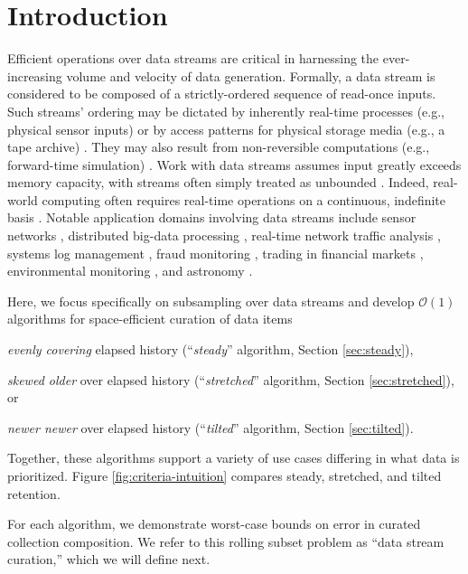 \section{Introduction} \label{sec:introduction}

Efficient operations over data streams are critical in harnessing the ever-increasing volume and velocity of data generation.
Formally, a data stream is considered to be composed of a strictly-ordered sequence of read-once inputs.
Such streams' ordering may be dictated by inherently real-time processes (e.g., physical sensor inputs) or by access patterns for physical storage media (e.g., a tape archive) \citep{henzinger1998computing}.
They may also result from non-reversible computations (e.g., forward-time simulation) \citep{abdulla2004simulation,schutzel2014stream}.
Work with data streams assumes input greatly exceeds memory capacity, with streams often simply treated as unbounded \citep{jiang2006research}.
Indeed, real-world computing often requires real-time operations on a continuous, indefinite basis \citep{cordeiro2016online}.
Notable application domains involving data streams include sensor networks \citep{elnahrawy2003research}, distributed big-data processing \citep{he2010comet}, real-time network traffic analysis \citep{johnson2005streams,muthukrishnan2005data}, systems log management \citep{fischer2012real}, fraud monitoring \citep{rajeshwari2016real}, trading in financial markets \citep{agarwal2009faster}, environmental monitoring \citep{hill2009real}, and astronomy \citep{graham2012data}.

Here, we focus specifically on subsampling over data streams and develop $\mathcal{O}(1)$ algorithms for space-efficient curation of data items
\begin{enumerate*}
\item \textit{evenly covering} elapsed history (``\textit{steady}'' algorithm, Section \ref{sec:steady}),
\item \textit{skewed older} over elapsed history (``\textit{stretched}'' algorithm, Section \ref{sec:stretched}), or
\item \textit{newer newer} over elapsed history (``\textit{tilted}'' algorithm, Section \ref{sec:tilted}).
\end{enumerate*}
Together, these algorithms support a variety of use cases differing in what data is prioritized.
Figure \ref{fig:criteria-intuition} compares steady, stretched, and tilted retention.

For each algorithm, we demonstrate worst-case bounds on error in curated collection composition.
We refer to this rolling subset problem as ``data stream curation,'' which we will define next.






